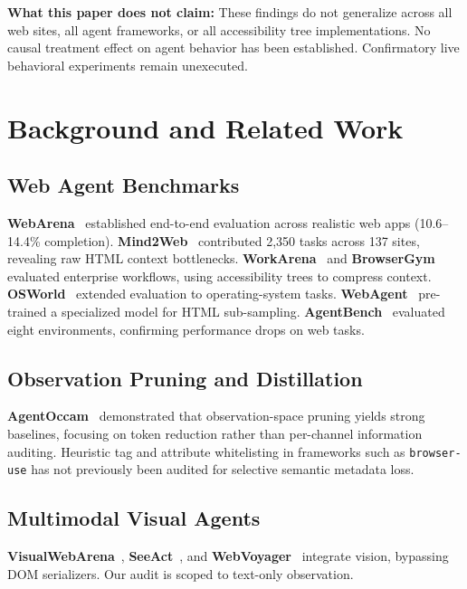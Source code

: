 \documentclass[conference]{IEEEtran}
\begin{document}
\textbf{What this paper does not claim:} These findings do not generalize across all web sites, all agent frameworks, or all accessibility tree implementations. No causal treatment effect on agent behavior has been established. Confirmatory live behavioral experiments remain unexecuted.

\section{Background and Related Work}
\label{sec:related}

\subsection{Web Agent Benchmarks}
\textbf{WebArena}~\cite{zhou2024webarena} established end-to-end evaluation across realistic web apps (10.6--14.4\% completion). \textbf{Mind2Web}~\cite{deng2023mind2web} contributed 2,350 tasks across 137 sites, revealing raw HTML context bottlenecks. \textbf{WorkArena}~\cite{drouin2024workarena, workarenapp2024} and \textbf{BrowserGym} evaluated enterprise workflows, using accessibility trees to compress context. \textbf{OSWorld}~\cite{osworld2024} extended evaluation to operating-system tasks. \textbf{WebAgent}~\cite{gur2024webagent} pre-trained a specialized model for HTML sub-sampling. \textbf{AgentBench}~\cite{liu2024agentbench} evaluated eight environments, confirming performance drops on web tasks.

\subsection{Observation Pruning and Distillation}
\textbf{AgentOccam}~\cite{agentoccam2025} demonstrated that observation-space pruning yields strong baselines, focusing on token reduction rather than per-channel information auditing. Heuristic tag and attribute whitelisting in frameworks such as \texttt{browser-use} has not previously been audited for selective semantic metadata loss.

\subsection{Multimodal Visual Agents}
\textbf{VisualWebArena}~\cite{koh2024visualwebarena}, \textbf{SeeAct}~\cite{zheng2024seeact}, and \textbf{WebVoyager}~\cite{he2024webvoyager} integrate vision, bypassing DOM serializers. Our audit is scoped to text-only observation.
\end{document}
